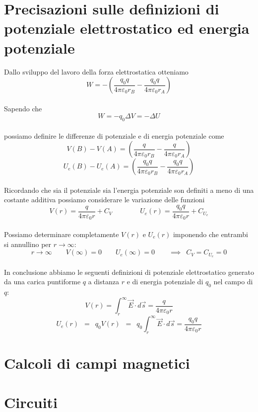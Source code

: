 \documentclass[x11names]{report}
\begin{document}
\section{Precisazioni sulle definizioni di potenziale elettrostatico ed energia potenziale}\label{precisazioni potenziale}
Dallo sviluppo del lavoro della forza elettrostatica otteniamo
\[
W = -\left(\frac{q_0 q}{4\pi \varepsilon_0 r_B} - \frac{q_0 q}{4\pi \varepsilon_0 r_A}\right)
\]\\
Sapendo che
\[
W = -q_0 \Delta V = -\Delta U 
\]\\
possiamo definire le differenze di potenziale e di energia potenziale come
\[
V(B) - V(A) = \left(\frac{ q}{4\pi \varepsilon_0 r_B} - \frac{q}{4\pi \varepsilon_0 r_A}\right)
\]
\[
U_e(B) - U_e(A) = \left(\frac{q_0 q}{4\pi \varepsilon_0 r_B} - \frac{q_0q}{4\pi \varepsilon_0 r_A}\right)
\]\\
Ricordando che sia il potenziale sia l'energia potenziale son definiti a meno di una costante additiva possiamo considerare le variazione delle funzioni
\[
V(r) = \frac{q}{4\pi\varepsilon_0 r} + C_V\qquad \qquad U_e(r) = \frac{q_0q}{4\pi\varepsilon_0 r} + C_{U_e}
\]\\
Possiamo determinare completamente \(V(r)\) e \(U_e(r)\) imponendo che  entrambi si annullino per \(r\to\infty\):
\[
r\to \infty \qquad V(\infty) = 0 \qquad U_e(\infty) = 0 \qquad \implies \;\ C_V = C_{U_e} = 0
\]\\
In conclusione abbiamo le seguenti definizioni di potenziale elettrostatico generato da una carica puntiforme \(q\) a distanza \(r\) e di energia potenziale di \(q_0\) nel campo di \(q\):
\[
V(r) = \int_{r}^{\infty} \vec{E}\cdot d\vec{s} = \frac{q}{4\pi\varepsilon_0 r}
\]
\[
U_e(r) \;\ = \;\ q_0V(r) \;\ = \;\ q_0\int_{r}^{\infty} \vec{E}\cdot d\vec{s} = \frac{q_0q}{4\pi\varepsilon_0 r}
\]

\section{Calcoli di campi magnetici}

\section{Circuiti}
\end{document}
